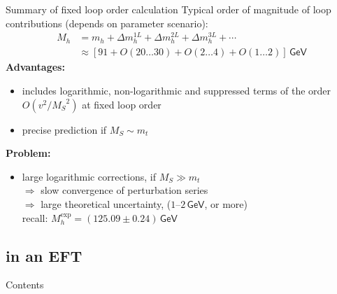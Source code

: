 \documentclass[hyperref={pdfpagelabels=false},ngerman]{beamer}
\newcommand{\eh}[1]{\,\mathsf{#1}}
\newcommand{\MS}{\ensuremath{M_S}}
\renewcommand{\emph}{\textbf}
\begin{document}
\begin{frame}{Summary of fixed loop order calculation}
  Typical order of magnitude of loop contributions (depends on
  parameter scenario):
  \begin{align*}
    M_h &= m_h + \Delta m_h^{1L} + \Delta m_h^{2L} + \Delta m_h^{3L} + \cdots \\
    &\approx [91 + O(20\ldots 30) + O(2\ldots 4) + O(1\ldots 2)] \eh{GeV}
  \end{align*}
  \emph{Advantages:}
  \begin{itemize}
  \item includes logarithmic, non-logarithmic and suppressed terms of
    the order $O(v^2/\MS^2)$ at fixed loop order
  \item precise prediction if $\MS \sim m_t$
  \end{itemize}
  \emph{Problem:}
  \begin{itemize}
  \item large logarithmic corrections, if $\MS \gg m_t$ \\
    $\Rightarrow$ slow convergence of perturbation series \\
    $\Rightarrow$ large theoretical uncertainty, ($1$--$2\eh{GeV}$, or
    more) \\
    recall: $M_h^{\text{exp}} = (125.09 \pm 0.24)\eh{GeV}$
  \end{itemize}
\end{frame}


\subsection{in an EFT}

\begin{frame}{Contents}
  \tableofcontents[
  currentsection,
  currentsubsection,
  subsectionstyle=show/shaded/hide]  
\end{frame}
\end{document}
